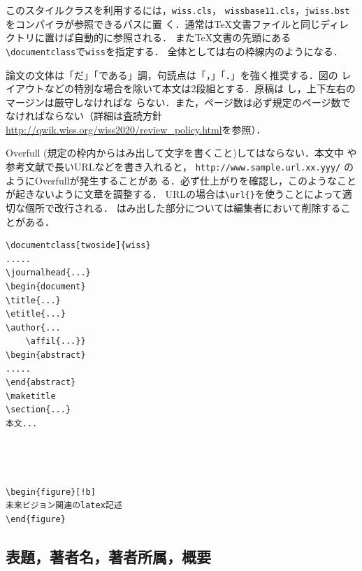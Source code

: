 \documentclass[twoside]{wiss}
\begin{document}
このスタイルクラスを利用するには，\verb|wiss.cls|，
\verb|wissbase11.cls|，\verb|jwiss.bst|をコンパイラが参照できるパスに置
く．通常は\TeX 文書ファイルと同じディレクトリに置けば自動的に参照される．
また\TeX 文書の先頭にある\verb|\documentclass|で\verb|wiss|を指定する．
全体としては右の枠線内のようになる．

論文の文体は「だ」「である」調，句読点は「，」「．」を強く推奨する．図の
レイアウトなどの特別な場合を除いて本文は2段組とする．原稿は
し，上下左右のマージンは厳守しなければな
らない．また，ページ数は必ず規定のページ数でなければならない（詳細は査読方針 \url{http://qwik.wiss.org/wiss2020/review_policy.html}を参照）．

Overfull (規定の枠内からはみ出して文字を書くこと)してはならない．本文中
や参考文献で長いURLなどを書き入れると，
\verb|http://www.sample.url.xx.yyy/| のようにOverfullが発生することがあ
る．必ず仕上がりを確認し，このようなことが起きないように文章を調整する．
URLの場合は\verb|\url{}|を使うことによって適切な個所で改行される．
はみ出した部分については編集者において削除することがある．

\begin{screen}
\begin{verbatim}
\documentclass[twoside]{wiss}
.....
\journalhead{...}
\begin{document}
\title{...}
\etitle{...}
\author{...
    \affil{...}}
\begin{abstract}
.....
\end{abstract}
\maketitle
\section{...}
本文...




\begin{figure}[!b]
未来ビジョン関連のlatex記述
\end{figure}
\end{verbatim}
\end{screen}



\subsection{表題，著者名，著者所属，概要}
\end{document}
